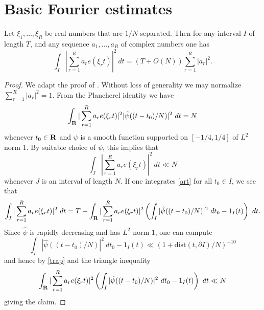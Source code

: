 \chapter{Basic Fourier estimates}

\begin{lemma}\label{l2-int}  Let $\xi_1,\dots,\xi_R$ be real numbers that are $1/N$-separated.  Then for any interval $I$ of length $T$, and any sequence $a_1,\dots,a_R$ of complex numbers one has
$$ \int_I |\sum_{r=1}^R a_r e(\xi_r t)|^2\ dt = (T + O(N)) \sum_{r=1}^R |a_r|^2.$$
\end{lemma}

\begin{proof} We adapt the proof of \cite[Theorem 9.1]{ik}.  Without loss of generality we may normalize
    $\sum_{r=1}^R |a_r|^2=1$.    From the Plancherel identity we have
\begin{equation}\label{art}
 \int_{\mathbf{R}} |\sum_{r=1}^R a_r e(\xi_r t)|^2 |\hat \psi((t-t_0)/N)|^2\ dt = N
 \end{equation}
whenever $t_0 \in \mathbf{R}$ and $\psi$ is a smooth function supported on $[-1/4, 1/4]$ of $L^2$ norm $1$.   By suitable choice of $\psi$, this implies that
\begin{equation}\label{trap}
 \int_J |\sum_{r=1}^R a_r e(\xi_r t)|^2\ dt \ll N
\end{equation}
whenever $J$ is an interval of length $N$.  If one integrates \eqref{art} for all $t_0 \in I$, we see that
$$ \int_I |\sum_{r=1}^R a_r e(\xi_r t)|^2\ dt = T - \int_\R |\sum_{r=1}^R a_r e(\xi_r t)|^2 \left(\int_I |\hat \psi((t-t_0)/N)|^2\ dt_0 - 1_I(t)\right)\ dt.$$
Since $\hat \psi$ is rapidly decreasing and has $L^2$ norm $1$, one can compute
$$ \int_I |\hat \psi((t-t_0)/N)|^2\ dt_0 - 1_I(t) \ll (1 + \mathrm{dist}(t, \partial I) / N)^{-10}$$
and hence by \eqref{trap} and the triangle inequality
$$ \int_{\mathbf{R}} |\sum_{r=1}^R a_r e(\xi_r t)|^2 \left(\int_I |\hat \psi((t-t_0)/N)|^2\ dt_0 - 1_I(t)\right)\ dt \ll N$$
giving the claim.
\end{proof}
